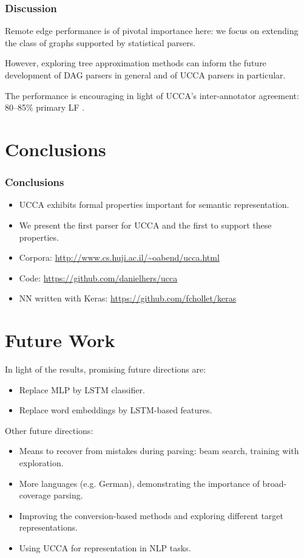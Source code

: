\documentclass[t]{beamer}
\begin{document}
\begin{frame}
\frametitle{Discussion}
Remote edge performance is of pivotal importance here: we focus on extending the class of graphs supported by statistical parsers.

\vfill
\pause
However, exploring tree approximation methods
can inform the future development of DAG parsers in general and of UCCA parsers in particular.

\vfill
\pause
The performance is encouraging in light of
UCCA's inter-annotator agreement: 80--85\%
primary LF \cite{abend2013universal}.
\end{frame}




\section{Conclusions}

\begin{frame}
\frametitle{Conclusions}
\begin{itemize}
 \item UCCA exhibits formal properties important for semantic representation.
 \item We present the first parser for UCCA and the first to support these properties.
\end{itemize}

\vfill
\pause
\begin{itemize}
 \item Corpora: \url{http://www.cs.huji.ac.il/~oabend/ucca.html}
 \item Code: \url{https://github.com/danielhers/ucca}
 \item NN written with Keras: \url{https://github.com/fchollet/keras}
\end{itemize}
\end{frame}



\section{Future Work}

\begin{frame}
In light of the results, promising future directions are:
\begin{itemize}
 \item Replace MLP by LSTM classifier.
 \item Replace word embeddings by LSTM-based features.
\end{itemize}

\vfill
\pause
Other future directions:
\begin{itemize}
 \item Means to recover from mistakes during parsing:
 beam search, training with exploration.
 \item More languages (e.g. German),
 demonstrating the importance of broad-coverage parsing.
 \item Improving the conversion-based methods and exploring different target representations.
 \item Using UCCA for representation in NLP tasks.
\end{itemize}
\end{frame}
\end{document}

